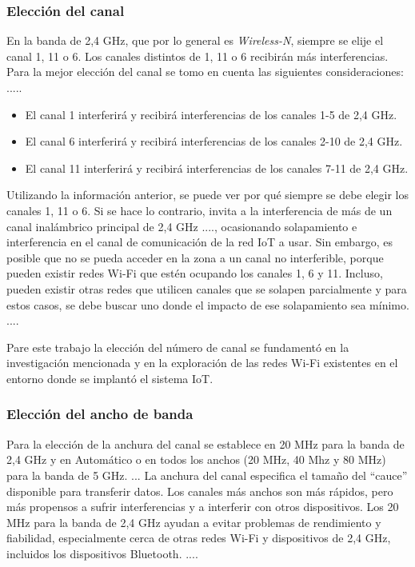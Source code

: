 \subsubsection{Elección del canal}
En la banda de 2,4 GHz, que por lo general es \emph{Wireless-N}, siempre se elije el canal 1, 11 o 6. Los canales distintos de 1, 11 o 6 recibirán más interferencias. Para la mejor  elección del canal se tomo en cuenta las siguientes consideraciones: .....

\begin{itemize}
\item El canal 1 interferirá y recibirá interferencias de los canales 1-5 de  2,4 GHz.
\item El canal 6 interferirá y recibirá interferencias de los canales 2-10 de  2,4 GHz.
\item El canal 11 interferirá y recibirá interferencias de los canales 7-11 de 2,4 GHz.
\end{itemize}

Utilizando la información anterior, se puede ver por qué siempre se debe elegir los canales 1, 11 o 6. Si se hace lo contrario, invita a la interferencia de más de un canal inalámbrico principal de 2,4 GHz ...., ocasionando solapamiento e interferencia en el canal de comunicación de la red IoT a usar. Sin embargo, es posible que no se pueda acceder en la zona a un canal no interferible, porque pueden existir redes Wi-Fi que estén ocupando los canales 1, 6 y 11. Incluso, pueden existir otras redes que utilicen canales que se solapen parcialmente y para estos casos, se debe buscar uno donde el impacto de ese solapamiento sea mínimo. ....

Pare este trabajo la elección del número de canal se fundamentó en la investigación mencionada y en la exploración de las redes Wi-Fi existentes en el entorno donde se implantó el sistema IoT.

\subsubsection{Elección del ancho de banda}

Para la elección de la anchura del canal se establece en 20 MHz para la banda de 2,4 GHz y en Automático o en todos los anchos (20 MHz, 40 Mhz y 80 MHz) para la banda de 5 GHz. ... La anchura del canal especifica el tamaño del ``cauce'' disponible para transferir datos. Los canales más anchos son más rápidos, pero más propensos a sufrir interferencias y a interferir con otros dispositivos. Los 20 MHz para la banda de 2,4 GHz ayudan a evitar problemas de rendimiento y fiabilidad, especialmente cerca de otras redes Wi-Fi y dispositivos de 2,4 GHz, incluidos los dispositivos Bluetooth. ....

